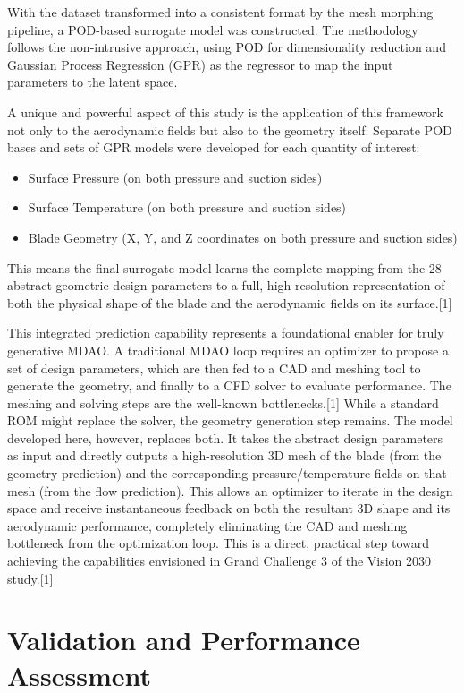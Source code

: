 \documentclass[12pt, a4paper]{report}
\begin{document}
With the dataset transformed into a consistent format by the mesh morphing pipeline, a POD-based surrogate model was constructed. The methodology follows the non-intrusive approach, using POD for dimensionality reduction and Gaussian Process Regression (GPR) as the regressor to map the input parameters to the latent space.

A unique and powerful aspect of this study is the application of this framework not only to the aerodynamic fields but also to the geometry itself. Separate POD bases and sets of GPR models were developed for each quantity of interest:
\begin{itemize}
    \item Surface Pressure (on both pressure and suction sides)
    \item Surface Temperature (on both pressure and suction sides)
    \item Blade Geometry (X, Y, and Z coordinates on both pressure and suction sides)
\end{itemize}
This means the final surrogate model learns the complete mapping from the 28 abstract geometric design parameters to a full, high-resolution representation of both the physical shape of the blade and the aerodynamic fields on its surface.[1]

This integrated prediction capability represents a foundational enabler for truly generative MDAO. A traditional MDAO loop requires an optimizer to propose a set of design parameters, which are then fed to a CAD and meshing tool to generate the geometry, and finally to a CFD solver to evaluate performance. The meshing and solving steps are the well-known bottlenecks.[1] While a standard ROM might replace the solver, the geometry generation step remains. The model developed here, however, replaces both. It takes the abstract design parameters as input and directly outputs a high-resolution 3D mesh of the blade (from the geometry prediction) and the corresponding pressure/temperature fields on that mesh (from the flow prediction). This allows an optimizer to iterate in the design space and receive instantaneous feedback on both the resultant 3D shape and its aerodynamic performance, completely eliminating the CAD and meshing bottleneck from the optimization loop. This is a direct, practical step toward achieving the capabilities envisioned in Grand Challenge 3 of the Vision 2030 study.[1]

\section{Validation and Performance Assessment}
\end{document}
